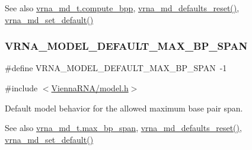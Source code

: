\begin{DoxySeeAlso}{See also}
\mbox{\hyperlink{group__model__details_aa0c3e03d9064363e27adcc92b8d0380f}{vrna\+\_\+md\+\_\+t.\+compute\+\_\+bpp}}, \mbox{\hyperlink{group__model__details_ga70834424cf804d149937de89f80ceb45}{vrna\+\_\+md\+\_\+defaults\+\_\+reset()}}, \mbox{\hyperlink{group__model__details_ga8ac6ff84936282436f822644bf841f66}{vrna\+\_\+md\+\_\+set\+\_\+default()}} 
\end{DoxySeeAlso}
\mbox{\label{group__model__details_ga7cb6f4ae8fdebff6746a4410814f2977}} 
\subsubsection{\texorpdfstring{VRNA\_MODEL\_DEFAULT\_MAX\_BP\_SPAN}{VRNA\_MODEL\_DEFAULT\_MAX\_BP\_SPAN}}
{\footnotesize\ttfamily \#define V\+R\+N\+A\+\_\+\+M\+O\+D\+E\+L\+\_\+\+D\+E\+F\+A\+U\+L\+T\+\_\+\+M\+A\+X\+\_\+\+B\+P\+\_\+\+S\+P\+AN~-\/1}



{\ttfamily \#include $<$\mbox{\hyperlink{model_8h}{Vienna\+R\+N\+A/model.\+h}}$>$}



Default model behavior for the allowed maximum base pair span. 

\begin{DoxySeeAlso}{See also}
\mbox{\hyperlink{group__model__details_a659e5fcc6e8c9f1a68e7de6548eef3b0}{vrna\+\_\+md\+\_\+t.\+max\+\_\+bp\+\_\+span}}, \mbox{\hyperlink{group__model__details_ga70834424cf804d149937de89f80ceb45}{vrna\+\_\+md\+\_\+defaults\+\_\+reset()}}, \mbox{\hyperlink{group__model__details_ga8ac6ff84936282436f822644bf841f66}{vrna\+\_\+md\+\_\+set\+\_\+default()}} 
\end{DoxySeeAlso}
\mbox{\label{group__model__details_ga8de04a9cb57e811e313b0f9f207f6bdb}} 
